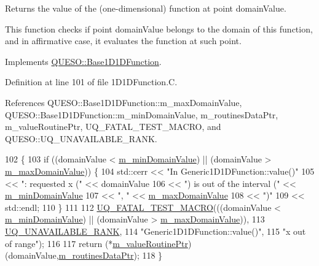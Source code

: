 Returns the value of the (one-\/dimensional) function at point {\ttfamily domain\-Value}. 

This function checks if point {\ttfamily domain\-Value} belongs to the domain of {\ttfamily this} function, and in affirmative case, it evaluates the function at such point. 

Implements \hyperlink{class_q_u_e_s_o_1_1_base1_d1_d_function_a1042dfd930c30a35d6dbf70f94e8dfe5}{Q\-U\-E\-S\-O\-::\-Base1\-D1\-D\-Function}.



Definition at line 101 of file 1\-D1\-D\-Function.\-C.



References Q\-U\-E\-S\-O\-::\-Base1\-D1\-D\-Function\-::m\-\_\-max\-Domain\-Value, Q\-U\-E\-S\-O\-::\-Base1\-D1\-D\-Function\-::m\-\_\-min\-Domain\-Value, m\-\_\-routines\-Data\-Ptr, m\-\_\-value\-Routine\-Ptr, U\-Q\-\_\-\-F\-A\-T\-A\-L\-\_\-\-T\-E\-S\-T\-\_\-\-M\-A\-C\-R\-O, and Q\-U\-E\-S\-O\-::\-U\-Q\-\_\-\-U\-N\-A\-V\-A\-I\-L\-A\-B\-L\-E\-\_\-\-R\-A\-N\-K.


\begin{DoxyCode}
102 \{
103   \textcolor{keywordflow}{if} ((domainValue < \hyperlink{class_q_u_e_s_o_1_1_base1_d1_d_function_a7b18b3854ee74ef5befbc67b75ebbdc5}{m\_minDomainValue}) || (domainValue > 
      \hyperlink{class_q_u_e_s_o_1_1_base1_d1_d_function_aa0025999ccab2145cd46c0a81e260e8f}{m\_maxDomainValue})) \{
104     std::cerr << \textcolor{stringliteral}{"In Generic1D1DFunction::value()"}
105               << \textcolor{stringliteral}{": requested x ("}            << domainValue
106               << \textcolor{stringliteral}{") is out of the interval ("} << \hyperlink{class_q_u_e_s_o_1_1_base1_d1_d_function_a7b18b3854ee74ef5befbc67b75ebbdc5}{m\_minDomainValue}
107               << \textcolor{stringliteral}{", "}                         << \hyperlink{class_q_u_e_s_o_1_1_base1_d1_d_function_aa0025999ccab2145cd46c0a81e260e8f}{m\_maxDomainValue}
108               << \textcolor{stringliteral}{")"}
109               << std::endl;
110   \}
111 
112   \hyperlink{_defines_8h_a56d63d18d0a6d45757de47fcc06f574d}{UQ\_FATAL\_TEST\_MACRO}(((domainValue < \hyperlink{class_q_u_e_s_o_1_1_base1_d1_d_function_a7b18b3854ee74ef5befbc67b75ebbdc5}{m\_minDomainValue}) || (domainValue 
      > \hyperlink{class_q_u_e_s_o_1_1_base1_d1_d_function_aa0025999ccab2145cd46c0a81e260e8f}{m\_maxDomainValue})),
113                       \hyperlink{namespace_q_u_e_s_o_a7d4679800a430ae8e473c1c7bc0bfb21}{UQ\_UNAVAILABLE\_RANK},
114                       \textcolor{stringliteral}{"Generic1D1DFunction::value()"},
115                       \textcolor{stringliteral}{"x out of range"});
116 
117   \textcolor{keywordflow}{return} (*\hyperlink{class_q_u_e_s_o_1_1_generic1_d1_d_function_a7b3fcf1c3e06132c5c7e5c3e1a87134c}{m\_valueRoutinePtr})(domainValue,\hyperlink{class_q_u_e_s_o_1_1_generic1_d1_d_function_a57e54587cb5511615131144485513ab6}{m\_routinesDataPtr});
118 \}
\end{DoxyCode}



